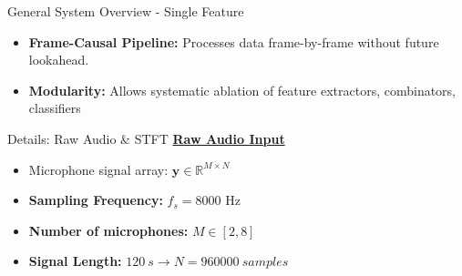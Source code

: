 \documentclass[8pt,hyperref={pdfpagelabels=true},xcolor=table,aspectratio=169]{beamer}
\begin{document}
\begin{frame}{General System Overview - Single Feature}
        \vspace{1.5em}
    \begin{itemize}
        \item<6-> \textbf{Frame-Causal Pipeline:} Processes data frame-by-frame without future lookahead.
        \item<6-> \textbf{Modularity:} Allows systematic ablation of feature extractors, combinators, classifiers
    \end{itemize}
\end{frame}



\begin{frame}{Details: Raw Audio \& STFT}
    \underline{\textbf{Raw Audio Input}}
    \vspace{1.0em}
    \begin{itemize}
        \item Microphone signal array: $\mathbf{y} \in \mathbb{R}^{M \times N}$
        \item \textbf{Sampling Frequency:} $f_s = 8000$ Hz
        \item \textbf{Number of microphones:} $M \in [2, 8]$
        \item \textbf{Signal Length:} $\SI{120}{s} \rightarrow N = \SI{960000}{samples}$ \
    \end{itemize}
    \vspace{2em}
\end{frame}
\end{document}
